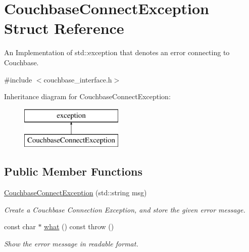 \hypertarget{structCouchbaseConnectException}{\section{Couchbase\-Connect\-Exception Struct Reference}
\label{structCouchbaseConnectException}
}


An Implementation of std\-::exception that denotes an error connecting to Couchbase.  




{\ttfamily \#include $<$couchbase\-\_\-interface.\-h$>$}

Inheritance diagram for Couchbase\-Connect\-Exception\-:\begin{figure}[H]
\begin{center}
\leavevmode
\includegraphics[height=2.000000cm]{structCouchbaseConnectException}
\end{center}
\end{figure}
\subsection*{Public Member Functions}
\begin{DoxyCompactItemize}
\item 
\hypertarget{structCouchbaseConnectException_a736ad01618360d2e87cf1ec7e044e1c4}{\hyperlink{structCouchbaseConnectException_a736ad01618360d2e87cf1ec7e044e1c4}{Couchbase\-Connect\-Exception} (std\-::string msg)}\label{structCouchbaseConnectException_a736ad01618360d2e87cf1ec7e044e1c4}

\begin{DoxyCompactList}\small\item\em Create a Couchbase Connection Exception, and store the given error message. \end{DoxyCompactList}\item 
\hypertarget{structCouchbaseConnectException_a6a6c10de0766bd4c132538111c78cade}{const char $\ast$ \hyperlink{structCouchbaseConnectException_a6a6c10de0766bd4c132538111c78cade}{what} () const   throw ()}\label{structCouchbaseConnectException_a6a6c10de0766bd4c132538111c78cade}

\begin{DoxyCompactList}\small\item\em Show the error message in readable format. \end{DoxyCompactList}\end{DoxyCompactItemize}
